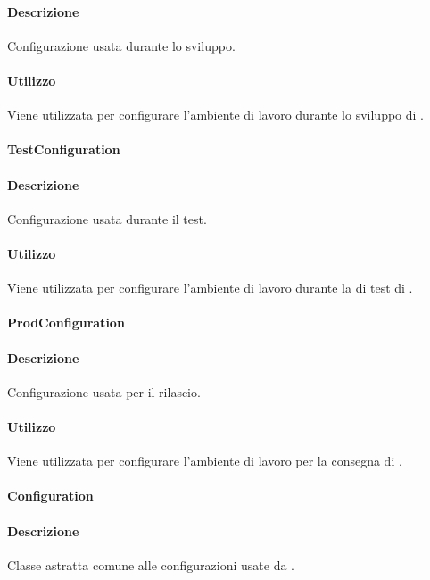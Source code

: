 \paragraph*{Descrizione}
Configurazione usata durante lo sviluppo.

\paragraph*{Utilizzo}
Viene utilizzata per configurare l'ambiente di lavoro durante lo sviluppo di .

\paragraph{TestConfiguration}
\paragraph*{Descrizione}
Configurazione usata durante il test.

\paragraph*{Utilizzo}
Viene utilizzata per configurare l'ambiente di lavoro durante la  di test di .

\paragraph{ProdConfiguration}
\paragraph*{Descrizione}
Configurazione usata per il rilascio.

\paragraph*{Utilizzo}
Viene utilizzata per configurare l'ambiente di lavoro per la consegna di .

\paragraph{Configuration}
\paragraph*{Descrizione}
Classe astratta comune alle configurazioni usate da .

